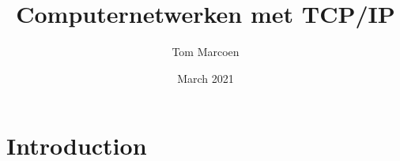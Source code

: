 \documentclass{article}
\title{Computernetwerken met TCP/IP}
\author{Tom Marcoen}
\date{March 2021}
\begin{document}
\maketitle

\section{Introduction}
\end{document}
